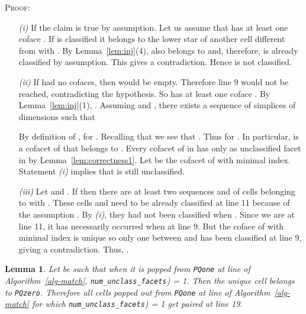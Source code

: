 \documentclass[12pt]{article}
\newtheorem{lem}[thm]{Lemma}
\newenvironment{proof}{\noindent\textsc{Proof: }}{\hfill\par\medskip\par}
\begin{document}
\begin{proof}
\begin{enumerate}
\item[{\em (i)}] If  the claim is true by assumption. Let us assume that   has at least one coface .  If  is  classified  it  belongs to the lower star of another cell  different from  with . By Lemma~\ref{lem:inj}(4), also  belongs to  and, therefore,  is already classified by assumption. This gives a contradiction. Hence  is not classified.

\item[{\em (ii)}] If  had no cofaces, then  would be empty. Therefore line 9 would not be reached, contradicting the hypothesis. So  has at least one coface . By Lemma~\ref{lem:inj}(1), . Assuming  and , there exists a sequence of simplices  of dimensions  such that
    
 By definition of ,  for . Recalling that  we see that . Thus  for . In particular,  is a cofacet of  that belongs to . Every cofacet of  in  has only  as unclassified facet in  by Lemma~\ref{lem:correctness1}. Let  be the cofacet of  with minimal index. Statement {\em (i)} implies that  is still unclassified.

\item[{\em (iii)}] Let  and . If  then there are at least two sequences  and  of cells belonging to   with . These cells  and   need to be already classified at line 11 because of the assumption .  By {\em (i)}, they had not been classified when . Since we are at line 11, it has necessarily occurred when  at line 9. But the coface  of  with minimal index is unique so only one between  and   has been classified at line 9, giving a contradiction. Thus, .
\end{enumerate}
\end{proof}

\begin{lem}\label{lem:line19}
 Let  be such that when it is popped from \texttt{PQone}
at line  of Algorithm~\ref{alg-match}, \texttt{{num}\_{unclass}\_{facets}}) = 1. Then the unique cell
 belongs to \texttt{PQzero}. Therefore all cells popped out from \texttt{PQone} at line  of Algorithm~\ref{alg-match} for which \texttt{{num}\_{unclass}\_{facets}}) = 1 get paired at line 19.
\end{lem}
\end{document}

